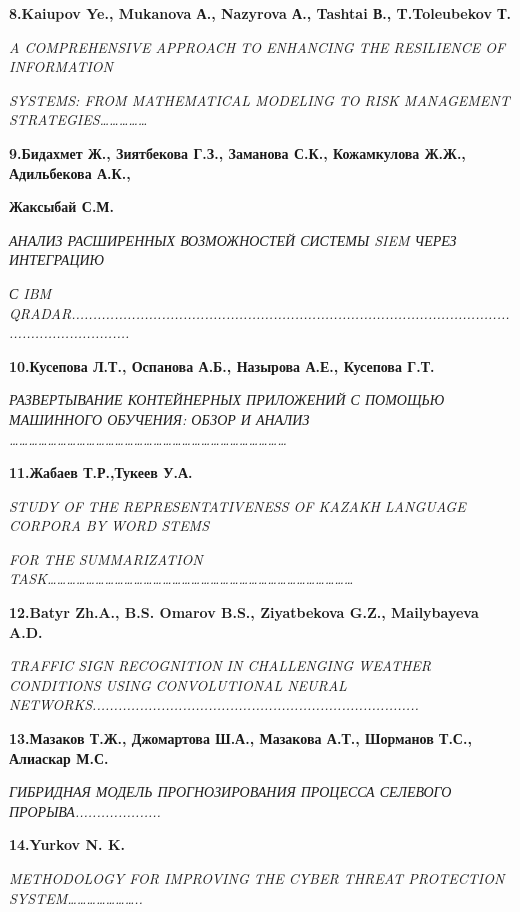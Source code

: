 {\bfseries 8.Kaiupov Ye., Mukanova А., Nazyrova А., Tashtai В.,
T.Toleubekov Т.}

\emph{A COMPREHENSIVE APPROACH TO ENHANCING THE RESILIENCE OF
INFORMATION}

\emph{SYSTEMS: FROM MATHEMATICAL MODELING TO RISK MANAGEMENT
STRATEGIES\ldots\ldots\ldots\ldots\ldots{}}

{\bfseries 9.Бидахмет Ж., Зиятбекова Г.З., Заманова С.К., Кожамкулова Ж.Ж.,
Адильбекова А.К.,}

{\bfseries Жаксыбай С.М.}

\emph{АНАЛИЗ РАСШИРЕННЫХ ВОЗМОЖНОСТЕЙ СИСТЕМЫ SIEM ЧЕРЕЗ ИНТЕГРАЦИЮ}

\emph{С IBM
QRADAR..................................................................................................................................}

{\bfseries 10.Кусепова Л.Т., Оспанова А.Б., Назырова А.Е., Кусепова Г.Т.}

\emph{РАЗВЕРТЫВАНИЕ КОНТЕЙНЕРНЫХ ПРИЛОЖЕНИЙ С ПОМОЩЬЮ МАШИННОГО
ОБУЧЕНИЯ: ОБЗОР И АНАЛИЗ
\ldots\ldots\ldots\ldots\ldots\ldots\ldots\ldots\ldots\ldots\ldots\ldots\ldots\ldots\ldots\ldots\ldots\ldots\ldots\ldots\ldots\ldots\ldots\ldots\ldots\ldots\ldots\ldots\ldots{}}

{\bfseries 11.Жабаев Т.Р.,Тукеев У.А.}

\emph{STUDY OF THE REPRESENTATIVENESS OF KAZAKH LANGUAGE CORPORA BY WORD
STEMS}

\emph{FOR THE SUMMARIZATION
TASK\ldots\ldots\ldots\ldots\ldots\ldots\ldots\ldots\ldots\ldots\ldots\ldots\ldots\ldots\ldots\ldots\ldots\ldots\ldots\ldots\ldots\ldots\ldots\ldots\ldots\ldots\ldots\ldots\ldots\ldots\ldots\ldots{}}

{\bfseries 12.Batyr Zh.A., B.S. Omarov B.S., Ziyatbekova G.Z., Mailybayeva
A.D.}

\emph{TRAFFIC SIGN RECOGNITION IN CHALLENGING WEATHER CONDITIONS USING
CONVOLUTIONAL NEURAL
NETWORKS............................................................................}

{\bfseries 13.Мазаков Т.Ж., Джомартова Ш.А., Мазакова А.Т., Шорманов Т.С.,
Алиаскар М.С.}

\emph{ГИБРИДНАЯ МОДЕЛЬ ПРОГНОЗИРОВАНИЯ ПРОЦЕССА СЕЛЕВОГО
ПРОРЫВА....................}

{\bfseries 14.Yurkov N. K.}

\emph{METHODOLOGY FOR IMPROVING THE CYBER THREAT PROTECTION
SYSTEM\ldots\ldots\ldots\ldots\ldots\ldots\ldots..}

